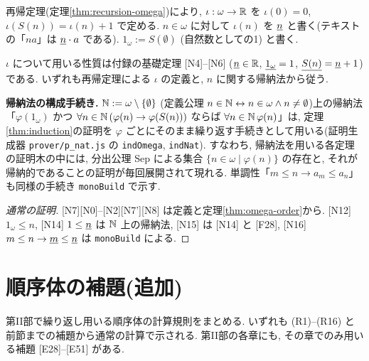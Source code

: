 \begin{dfn}
  再帰定理(定理\ref{thm:recursion-omega})により, $\iota : \omega \to \mathbb{R}$ を $\iota(0) = 0$, $\iota(S(n)) = \iota(n) + 1$ で定める. $n \in \omega$ に対して $\iota(n)$ を $\underline{n}$ と書く(テキストの「$na$」は $\underline{n} \cdot a$ である). $1_\omega := S(\emptyset)$ (自然数としての1) と書く.
\end{dfn}

$\iota$ について用いる性質は付録の基礎定理 [N4]--[N6] ($\underline{n} \in \mathbb{R}$, $\underline{1_\omega} = 1$, $\underline{S(n)} = \underline{n} + 1$)である. いずれも再帰定理による $\iota$ の定義と, $n$ に関する帰納法から従う.


\medskip\noindent\textbf{帰納法の構成手続き.}\quad
$\mathbb{N} := \omega \setminus \{\emptyset\}$ (定義公理 $n \in \mathbb{N} \leftrightarrow n \in \omega \land n \neq \emptyset$)上の帰納法「$\varphi(1_\omega)$ かつ $\forall n \in \mathbb{N}\,(\varphi(n) \to \varphi(S(n)))$ ならば $\forall n \in \mathbb{N}\,\varphi(n)$」は, 定理\ref{thm:induction}の証明を $\varphi$ ごとにそのまま繰り返す手続きとして用いる(証明生成器 \texttt{prover/p\_nat.js} の \texttt{indOmega}, \texttt{indNat}). すなわち, 帰納法を用いる各定理の証明木の中には, 分出公理 \textsf{Sep} による集合 $\{n \in \omega \mid \varphi(n)\}$ の存在と, それが帰納的であることの証明が毎回展開されて現れる. 単調性「$m \leq n \to a_m \leq a_n$」も同様の手続き \texttt{monoBuild} で示す.

\begin{lem}\label{lem:nat}
\end{lem}
\begin{proof}[通常の証明]
  [N7][N0]--[N2][N7'][N8] は定義と定理\ref{thm:omega-order}から. [N12] $1_\omega \leq n$, [N14] $1 \leq \underline{n}$ は $\mathbb{N}$ 上の帰納法, [N15] は [N14] と [F28], [N16] $m \leq n \to \underline{m} \leq \underline{n}$ は \texttt{monoBuild} による.
\end{proof}

\section{順序体の補題(追加)}

第II部で繰り返し用いる順序体の計算規則をまとめる. いずれも (R1)--(R16) と前節までの補題から通常の計算で示される. 第II部の各章にも, その章でのみ用いる補題 [E28]--[E51] がある.

